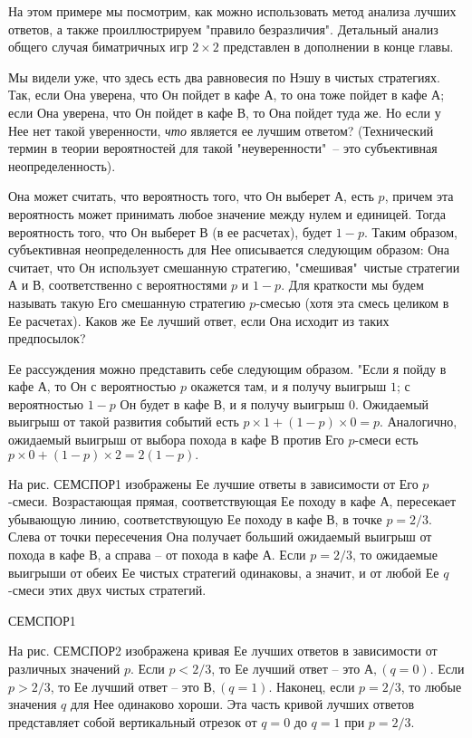 {На этом примере мы посмотрим, как можно использовать метод анализа лучших
ответов, а также проиллюстрируем "правило безразличия". Детальный анализ
общего случая биматричных игр $2\times2$ представлен в дополнении в конце главы.

Мы видели уже, что здесь есть два равновесия по Нэшу в чистых стратегиях.
Так, если Она уверена, что Он пойдет в кафе А, то она тоже пойдет в кафе А;
если Она уверена, что Он пойдет в кафе В, то Она пойдет туда же. Но если
у Нее нет такой уверенности, \emph{что} является ее лучшим ответом?
(Технический термин в теории вероятностей для такой "неуверенности"\, --
это субъективная неопределенность).

Она может считать, что вероятность того, что Он выберет А, есть
$p$, причем эта вероятность может принимать любое значение между нулем и единицей.
Тогда вероятность того, что Он выберет В (в ее расчетах), будет $1-p$.
Таким образом, субъективная неопределенность для Нее описывается следующим образом:
Она считает, что Он использует смешанную стратегию, "смешивая"\, чистые стратегии
А и В, соответственно с вероятностями $p$ и $1-p$. Для краткости мы будем называть
такую Его смешанную стратегию $p$-смесью (хотя эта смесь целиком в Ее расчетах).
Каков же Ее лучший ответ, если Она исходит из таких предпосылок?

Ее рассуждения можно представить себе следующим образом. "Если я пойду в кафе А,
то Он с вероятностью $p$ окажется там, и я получу выигрыш $1$; с вероятностью
$1-p$ Он будет в кафе В, и я получу выигрыш $0$. Ожидаемый выигрыш от такой развития
событий есть $p\times1+(1-p)\times0=p$. Аналогично, ожидаемый выигрыш от выбора
похода в кафе В против Его $p$-смеси есть $p\times0+(1-p)\times2=2(1-p).$

На рис. СЕМСПОР1 изображены Ее лучшие ответы в зависимости от Его $p$-смеси.
Возрастающая прямая, соответствующая Ее походу в кафе А, пересекает убывающую
линию, соответствующую Ее походу в кафе В, в точке $p=2/3$. Слева от точки пересечения
Она получает больший ожидаемый выигрыш от похода в кафе В, а справа -- от похода в кафе А.
Если $p=2/3$, то ожидаемые выигрыши от обеих Ее чистых стратегий одинаковы, а значит,
и от любой Ее $q$-смеси этих двух чистых стратегий.

СЕМСПОР1

На рис. СЕМСПОР2 изображена кривая Ее лучших ответов в зависимости от различных значений $p$.
Если $p<2/3$, то Ее лучший ответ -- это $А, (q=0)$. Если $p>2/3$, то Ее лучший ответ --
это $В, (q=1)$. Наконец, если $p=2/3$, то любые значения $q$ для Нее одинаково хороши.
Эта часть кривой лучших ответов представляет собой вертикальный отрезок от $q=0$ до $q=1$
при $p=2/3$.

}
